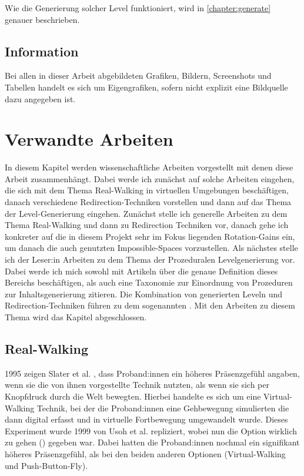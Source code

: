 Wie die Generierung solcher Level funktioniert, wird in \autoref{chapter:generate} genauer beschrieben.

\section{Information}
Bei allen in dieser Arbeit abgebildeten Grafiken, Bildern, Screenshots und Tabellen handelt es sich um Eigengrafiken, sofern nicht explizit eine Bildquelle dazu angegeben ist.

\chapter{Verwandte Arbeiten}\label{chapter:relatedwork}

In diesem Kapitel werden wissenschaftliche Arbeiten vorgestellt mit denen diese Arbeit zusammenhängt. Dabei werde ich zunächst auf solche Arbeiten eingehen, die sich mit dem Thema Real-Walking in virtuellen Umgebungen beschäftigen, danach verschiedene Redirection-Techniken vorstellen und dann auf das Thema der Level-Generierung eingehen. Zunächst stelle ich generelle Arbeiten zu dem Thema Real-Walking und dann zu Redirection Techniken vor, danach gehe ich konkreter auf die in diesem Projekt sehr im Fokus liegenden Rotation-Gains ein, um danach die auch genutzten Impossible-Spaces vorzustellen. Als nächstes stelle ich der Leser:in Arbeiten zu dem Thema der Prozeduralen Levelgenerierung vor. Dabei werde ich mich sowohl mit Artikeln über die genaue Definition dieses Bereichs beschäftigen, als auch eine Taxonomie zur Einordnung von Prozeduren zur Inhaltsgenerierung zitieren. Die Kombination von generierten Leveln und Redirection-Techniken führen zu dem sogenannten . Mit den Arbeiten zu diesem Thema wird das Kapitel abgeschlossen.

\section{Real-Walking}
1995 zeigen Slater et al. \cite{taking-steps}, dass Proband:innen ein höheres Präsenzgefühl angaben, wenn sie die von ihnen vorgestellte Technik  nutzten, als wenn sie sich per Knopfdruck durch die Welt bewegten. Hierbei handelte es sich um eine Virtual-Walking Technik, bei der die Proband:innen eine Gehbewegung simulierten die dann digital erfasst und in virtuelle Fortbewegung umgewandelt wurde. Dieses Experiment wurde 1999 von Usoh et al. \cite{usoh-vergleich-1999} repliziert, wobei nun die Option wirklich zu gehen () gegeben war. Dabei hatten die Proband:innen nochmal ein signifikant höheres Präsenzgefühl, als bei den beiden anderen Optionen (Virtual-Walking und Push-Button-Fly).

